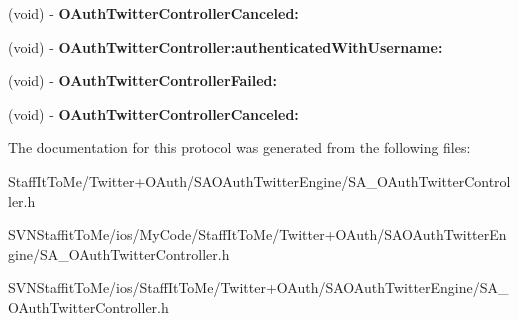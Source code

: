 \begin{DoxyCompactItemize}
\item 
\hypertarget{protocol_s_a___o_auth_twitter_controller_delegate-p_a77fde444a41b9997a495c9fd8b0def58}{
(void) -\/ {\bfseries \-O\-Auth\-Twitter\-Controller\-Canceled\-:}}
\label{protocol_s_a___o_auth_twitter_controller_delegate-p_a77fde444a41b9997a495c9fd8b0def58}

\item 
\hypertarget{protocol_s_a___o_auth_twitter_controller_delegate-p_a24452feb5fff248715325c8f0dfa264e}{
(void) -\/ {\bfseries \-O\-Auth\-Twitter\-Controller\-:authenticated\-With\-Username\-:}}
\label{protocol_s_a___o_auth_twitter_controller_delegate-p_a24452feb5fff248715325c8f0dfa264e}

\item 
\hypertarget{protocol_s_a___o_auth_twitter_controller_delegate-p_a8c22b3e713d5e3faf151190118e2c745}{
(void) -\/ {\bfseries \-O\-Auth\-Twitter\-Controller\-Failed\-:}}
\label{protocol_s_a___o_auth_twitter_controller_delegate-p_a8c22b3e713d5e3faf151190118e2c745}

\item 
\hypertarget{protocol_s_a___o_auth_twitter_controller_delegate-p_a77fde444a41b9997a495c9fd8b0def58}{
(void) -\/ {\bfseries \-O\-Auth\-Twitter\-Controller\-Canceled\-:}}
\label{protocol_s_a___o_auth_twitter_controller_delegate-p_a77fde444a41b9997a495c9fd8b0def58}

\end{DoxyCompactItemize}


\-The documentation for this protocol was generated from the following files\-:\begin{DoxyCompactItemize}
\item 
\-Staff\-It\-To\-Me/\-Twitter+\-O\-Auth/\-S\-A\-O\-Auth\-Twitter\-Engine/\-S\-A\-\_\-\-O\-Auth\-Twitter\-Controller.\-h\item 
\-S\-V\-N\-Staffit\-To\-Me/ios/\-My\-Code/\-Staff\-It\-To\-Me/\-Twitter+\-O\-Auth/\-S\-A\-O\-Auth\-Twitter\-Engine/\-S\-A\-\_\-\-O\-Auth\-Twitter\-Controller.\-h\item 
\-S\-V\-N\-Staffit\-To\-Me/ios/\-Staff\-It\-To\-Me/\-Twitter+\-O\-Auth/\-S\-A\-O\-Auth\-Twitter\-Engine/\-S\-A\-\_\-\-O\-Auth\-Twitter\-Controller.\-h\end{DoxyCompactItemize}
